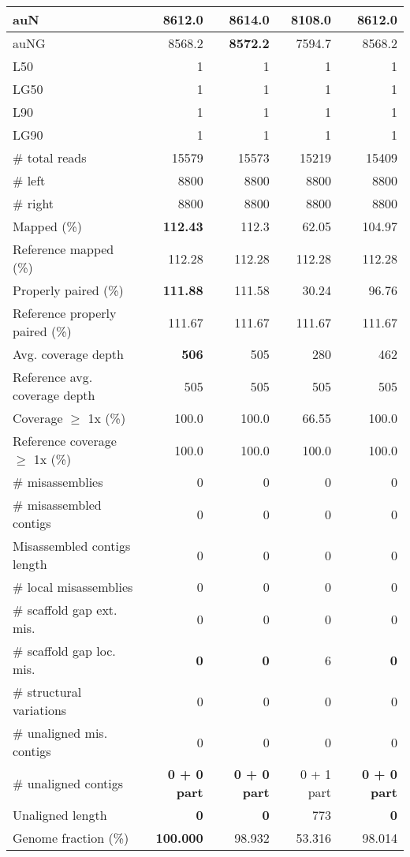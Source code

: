 \documentclass[12pt,a4paper]{article}
\begin{document}
\begin{table}[ht]
\begin{center}
\begin{tabular}{|l*{4}{|r}|}
auN & 8612.0 & {\bf 8614.0} & 8108.0 & 8612.0 \\ \hline
auNG & 8568.2 & {\bf 8572.2} & 7594.7 & 8568.2 \\ \hline
L50 & 1 & 1 & 1 & 1 \\ \hline
LG50 & 1 & 1 & 1 & 1 \\ \hline
L90 & 1 & 1 & 1 & 1 \\ \hline
LG90 & 1 & 1 & 1 & 1 \\ \hline
\# total reads & 15579 & 15573 & 15219 & 15409 \\ \hline
\# left & 8800 & 8800 & 8800 & 8800 \\ \hline
\# right & 8800 & 8800 & 8800 & 8800 \\ \hline
Mapped (\%) & {\bf 112.43} & 112.3 & 62.05 & 104.97 \\ \hline
Reference mapped (\%) & 112.28 & 112.28 & 112.28 & 112.28 \\ \hline
Properly paired (\%) & {\bf 111.88} & 111.58 & 30.24 & 96.76 \\ \hline
Reference properly paired (\%) & 111.67 & 111.67 & 111.67 & 111.67 \\ \hline
Avg. coverage depth & {\bf 506} & 505 & 280 & 462 \\ \hline
Reference avg. coverage depth & 505 & 505 & 505 & 505 \\ \hline
Coverage $\geq$ 1x (\%) & 100.0 & 100.0 & 66.55 & 100.0 \\ \hline
Reference coverage $\geq$ 1x (\%) & 100.0 & 100.0 & 100.0 & 100.0 \\ \hline
\# misassemblies & 0 & 0 & 0 & 0 \\ \hline
\# misassembled contigs & 0 & 0 & 0 & 0 \\ \hline
Misassembled contigs length & 0 & 0 & 0 & 0 \\ \hline
\# local misassemblies & 0 & 0 & 0 & 0 \\ \hline
\# scaffold gap ext. mis. & 0 & 0 & 0 & 0 \\ \hline
\# scaffold gap loc. mis. & {\bf 0} & {\bf 0} & 6 & {\bf 0} \\ \hline
\# structural variations & 0 & 0 & 0 & 0 \\ \hline
\# unaligned mis. contigs & 0 & 0 & 0 & 0 \\ \hline
\# unaligned contigs & {\bf 0 + 0 part} & {\bf 0 + 0 part} & 0 + 1 part & {\bf 0 + 0 part} \\ \hline
Unaligned length & {\bf 0} & {\bf 0} & 773 & {\bf 0} \\ \hline
Genome fraction (\%) & {\bf 100.000} & 98.932 & 53.316 & 98.014 \\ \hline

\end{tabular}
\end{center}
\end{table}
\end{document}
